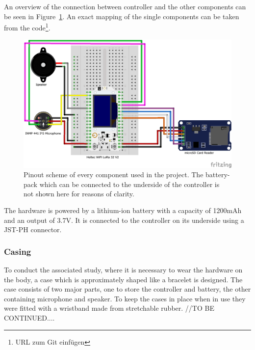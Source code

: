 An overview of the connection between controller and the other components can be seen in Figure~\ref{fig:pinout}.
An exact mapping of the single components can be taken from the code\footnote{URL zum Git einfügen}.
\begin{figure}[H]
	\includegraphics[width=\linewidth]{Media/Hardware_Pinout.png}
	\caption{Pinout scheme of every component used in the project. The battery-pack which can be connected to the underside of the controller is not shown here for reasons of clarity.}
	\label{fig:pinout}
\end{figure}
The hardware is powered by a lithium-ion battery with a capacity of 1200mAh and an output of 3.7V.
It is connected to the controller on its underside using a JST-PH connector. 

\subsubsection{Casing}
To conduct the associated study, where it is necessary to wear the hardware on the body, a case which is approximately shaped like a bracelet is designed.
The case consists of two major parts, one to store the controller and battery, the other containing microphone and speaker.
To keep the cases in place when in use they were fitted with a wristband made from stretchable rubber.
//TO BE CONTINUED....

